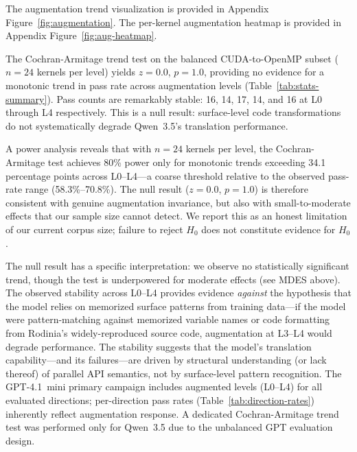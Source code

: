 \documentclass{article}
\begin{document}
The augmentation trend visualization is provided in Appendix Figure~\ref{fig:augmentation}.
The per-kernel augmentation heatmap is provided in Appendix Figure~\ref{fig:aug-heatmap}.


The Cochran-Armitage trend test on the balanced CUDA-to-OpenMP subset ($n=24$ kernels per level) yields $z = 0.0$, $p = 1.0$, providing no evidence for a monotonic trend in pass rate across augmentation levels (Table~\ref{tab:stats-summary}). Pass counts are remarkably stable: 16, 14, 17, 14, and 16 at L0 through L4 respectively. This is a null result: surface-level code transformations do not systematically degrade Qwen~3.5's translation performance.

A power analysis reveals that with $n=24$ kernels per level,
the Cochran-Armitage test achieves 80\% power only for monotonic
trends exceeding 34.1 percentage points across L0--L4---a coarse
threshold relative to the observed pass-rate range
(58.3\%--70.8\%). The null result ($z = 0.0$, $p = 1.0$) is
therefore consistent with genuine augmentation invariance, but
also with small-to-moderate effects that our sample size cannot
detect. We report this as an honest limitation of our current
corpus size; failure to reject $H_0$ does not constitute evidence
for $H_0$.

The null result has a specific interpretation: we observe no statistically significant trend, though the test is underpowered for moderate effects (see MDES above). The observed stability across L0--L4 provides evidence \emph{against} the hypothesis that the model relies on memorized surface patterns from training data---if the model were pattern-matching against memorized variable names or code formatting from Rodinia's widely-reproduced source code, augmentation at L3--L4 would degrade performance. The stability suggests that the model's translation capability---and its failures---are driven by structural understanding (or lack thereof) of parallel API semantics, not by surface-level pattern recognition. The GPT-4.1~mini primary campaign includes augmented levels (L0--L4) for all evaluated directions; per-direction pass rates (Table~\ref{tab:direction-rates}) inherently reflect augmentation response. A dedicated Cochran-Armitage trend test was performed only for Qwen~3.5 due to the unbalanced GPT evaluation design. %
\end{document}
